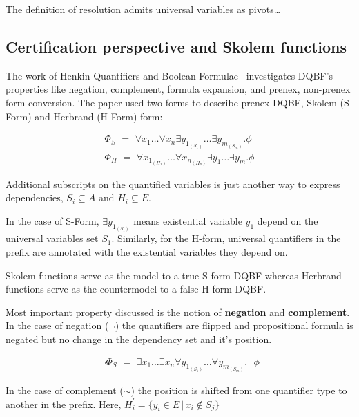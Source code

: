 \documentclass[runningheads]{llncs}
\begin{document}
The definition of resolution admits universal variables as pivots\dots

\subsection{Certification perspective and Skolem functions}

The work of Henkin Quantifiers and Boolean Formulae~\cite{balabanov2012henkin} investigates DQBF's properties like negation, complement, formula expansion, and prenex, non-prenex form conversion.
%
The paper used two forms to describe prenex DQBF, Skolem (S-Form) and Herbrand (H-Form) form:

\begin{align}
\Phi_{S} \,\, = \,\, \forall x_{1}\dots \forall x_{n} \exists y_{1_{(S_{1})}}\dots\exists y_{m_{(S_{m})}} . \phi \label{eq1}\\
\Phi_{H}  \,\, = \,\, \forall x_{1_{(H_{1})}}\dots \forall x_{n_{(H_{n})}} \exists y_{1}\dots\exists y_{m} . \phi \label{eq2}
\end{align}

Additional subscripts on the quantified variables is just another way to express dependencies, $S_{i} \subseteq A$ and $H_{i} \subseteq E$.

In the case of S-Form, $\exists y_{1_{(S_{1})}}$ means  existential variable $y_{1}$ depend on the universal variables set $S_{1}$.
%
Similarly, for the H-form, universal quantifiers in the prefix are annotated with the existential variables they depend on.

Skolem functions serve as the model to a true S-form DQBF whereas Herbrand functions serve as the countermodel to a false H-form DQBF.

Most important property discussed is the notion of \textbf{negation} and \textbf{complement}.
%
In the case of negation ($\neg$) the quantifiers are flipped and propositional formula is negated but no change in the dependency set and it's position.

\begin{align}
\neg \Phi_{S} \,\, =   \,\, \exists x_{1}\dots \exists x_{n} \forall y_{1_{(S_{1})}}\dots\forall y_{m_{(S_{m})}} . \neg \phi \label{eq3}
\end{align}

In the case of complement ($\sim$) the position is shifted from one quantifier type to another in the prefix. Here, $H^{\prime}_{i} = \{ y_{i} \in E \, | \, x_{i} \notin S_{j} \}$
\end{document}
